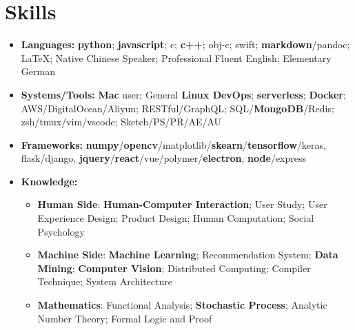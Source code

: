 \documentclass[letterpaper,11pt]{article}
\newcommand{\resumeItem}[2]{
  \item\small{
    \textbf{#1}{: #2 \vspace{-2pt}}
  }
}
\newcommand{\resumeSubHeadingListStart}{\begin{itemize}[leftmargin=*]}
\newcommand{\resumeSubHeadingListEnd}{\end{itemize}}
\newcommand{\resumeItemListStart}{\begin{itemize}}
\newcommand{\resumeItemListEnd}{\end{itemize}\vspace{-5pt}}
\begin{document}
\section{Skills}
 \resumeSubHeadingListStart
   \item{
     \textbf{Languages:}{ 
      \textbf{python}; \textbf{javascript}; 
      c; \textbf{c++}; obj-c; swift; 
      \textbf{markdown}/pandoc; \LaTeX; 
      Native Chinese Speaker; Professional Fluent English; Elementary German
     }
   }
   \item{
    \textbf{Systems/Tools:}{ 
      \textbf{Mac} user; General \textbf{Linux DevOps}; \textbf{serverless};
      \textbf{Docker}; AWS/DigitalOcean/Aliyun; 
      RESTful/GraphQL;
      SQL/\textbf{MongoDB}/Redis; 
      zsh/tmux/vim/vscode; 
      Sketch/PS/PR/AE/AU
    }
   }
   \item{
    \textbf{Frameworks:}{ 
      \textbf{numpy}/\textbf{opencv}/matplotlib/\textbf{skearn}/\textbf{tensorflow}/keras, 
      flask/django, 
      \textbf{jquery}/\textbf{react}/vue/polymer/\textbf{electron}, 
      \textbf{node}/express
    }
   }
   \item{
     \textbf{Knowledge:}{ 
       \resumeItemListStart
        \resumeItem{Human Side}
          { 
            \textbf{Human-Computer Interaction}; 
            User Study; 
            User Experience Design; 
            Product Design; 
            Human Computation; 
            Social Psychology
          }
        \resumeItem{Machine Side}
          { 
            \textbf{Machine Learning}; 
            Recommendation System; 
            \textbf{Data Mining}; 
            \textbf{Computer Vision}; 
            Distributed Computing; 
            Compiler Technique; 
            System Architecture
          }
        \resumeItem{Mathematics}
          { 
            Functional Analysis; 
            \textbf{Stochastic Process}; 
            Analytic Number Theory; 
            Formal Logic and Proof
          }
      \resumeItemListEnd
     }
   }
 \resumeSubHeadingListEnd
\end{document}
